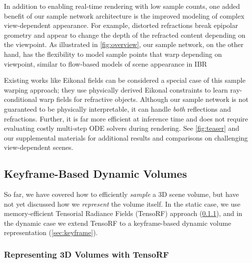 \documentclass[10pt,twocolumn,letterpaper]{article}
\begin{document}
In addition to enabling real-time rendering with low sample counts, one added benefit of our sample network architecture is the improved modeling of complex view-dependent appearance.
For example, distorted refractions break epipolar geometry and appear to change the depth of the refracted content depending on the viewpoint.
As illustrated in \cref{fig:overview}, our sample network, on the other hand, has the flexibility to model sample points that warp depending on viewpoint, similar to flow-based models of scene appearance in IBR~\cite{nieto2017linearizing}

Existing works like Eikonal fields \cite{BemanMFSR2022} can be considered a special case of this sample warping approach; they use physically derived Eikonal constraints to learn ray-conditional warp fields for refractive objects.
Although our sample network is not guaranteed to be physically interpretable, it can handle \textit{both} reflections and refractions. Further, it is far more efficient at inference time and does not require evaluating costly multi-step ODE solvers during rendering.
See \cref{fig:teaser} and our supplemental materials for additional results and comparisons on challenging view-dependent scenes.

\subsection{Keyframe-Based Dynamic Volumes}

So far, we have covered how to efficiently \textit{sample} a 3D scene volume, but have not yet discussed how we \textit{represent} the volume itself.
In the static case, we use memory-efficient Tensorial Radiance Fields (TensoRF) approach (\cref{sec:tensorialradiancefields}), and in the dynamic case we extend TensoRF to a keyframe-based dynamic volume representation (\cref{sec:keyframe}).


\subsubsection{Representing 3D Volumes with TensoRF~\cite{ChenXGYS2022}}
\label{sec:tensorialradiancefields}
\end{document}
